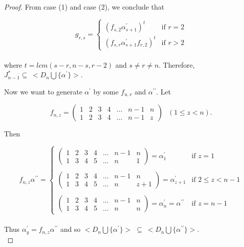 \documentclass[10pt]{extarticle}
\numberwithin{equation}{section}
\numberwithin{bbb}{section}
\numberwithin{equation}{section}
\begin{document}
\begin{proof}
\vspace{0.5cm}
From case (1) and case (2), we conclude that 

\begin{equation*}
    g_{r,s}= \begin{cases}
     (f_{s,2}\alpha^{\prime}_{s+1})^{t} & \text{if } r=2\\
    (f_{s,r}\alpha^{\prime}_{s+1}f_{r,2})^{t} & \text{if } r>2
    \end{cases}
\end{equation*}\\[10pt]
where $t=lcm(s-r,n-s,r-2)$ and $s \neq r \neq n$. Therefore, $J^*_{n-1}\subseteq \ <D_n \bigcup \{\alpha^\prime\}>$.

\vspace{0.9cm}
Now we want to generate $\alpha^\prime$ by some $f_{u,v}$ and $\alpha^{\prime\prime}$. Let

\vspace{0.5cm}
$$f_{n,z}=
\begin{pmatrix}  
1&2&3&4&...&n-1&n\\1&2&3&4&...&n-1&z
\end{pmatrix} \ \ \ (1\leq z <n).$$

Then

\vspace{0.5cm}
\begin{equation*}
f_{n,z}\alpha^{\prime\prime}=
    \begin{cases}
    \begin{pmatrix}  
1&2&3&4&...&n-1&n\\1&3&4&5&...&n&1
\end{pmatrix}=\alpha^{\prime}_1 & \text{if } z=1\\
\\
    \begin{pmatrix}  
1&2&3&4&...&n-1&n\\1&3&4&5&...&n&z+1
\end{pmatrix}=\alpha^{\prime}_{z+1}  & \text{if } 2\leq z <n-1\\
\\
    \begin{pmatrix}  
1&2&3&4&...&n-1&n\\1&3&4&5&...&n&n
\end{pmatrix}=\alpha^{\prime}_n=\alpha^{\prime\prime}  & \text{if } z=n-1
    \end{cases}
\end{equation*}\\[10pt]
Thus $\alpha^{\prime}_y=f_{n,z}\alpha^{\prime\prime}$ and so $<D_n \bigcup \{\alpha^{\prime}\}>$ $\subseteq \ <D_n \bigcup \{\alpha^{\prime\prime}\}>$.\\
\end{proof}
\end{document}
